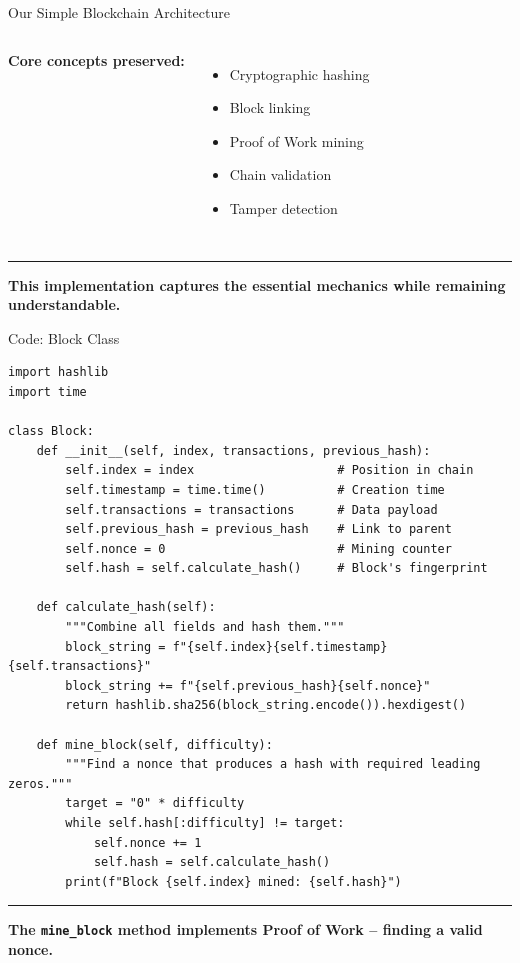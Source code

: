 \documentclass[8pt,aspectratio=169]{beamer}
\newcommand{\bottomnote}[1]{%
\vfill
\vspace{-2mm}
\textcolor{mllavender2}{\rule{\textwidth}{0.4pt}}
\vspace{1mm}
\footnotesize
\textbf{#1}
}
\begin{document}
\begin{frame}[t]{Our Simple Blockchain Architecture}
\begin{columns}[T]
\vspace{0.5em}
\textbf{Core concepts preserved:}
\begin{itemize}
\item[\textcolor{mlgreen}{$\checkmark$}] Cryptographic hashing
\item[\textcolor{mlgreen}{$\checkmark$}] Block linking
\item[\textcolor{mlgreen}{$\checkmark$}] Proof of Work mining
\item[\textcolor{mlgreen}{$\checkmark$}] Chain validation
\item[\textcolor{mlgreen}{$\checkmark$}] Tamper detection
\end{itemize}
\end{columns}

\bottomnote{This implementation captures the essential mechanics while remaining understandable.}
\end{frame}

\begin{frame}[fragile]{Code: Block Class}
\begin{lstlisting}[style=python]
import hashlib
import time

class Block:
    def __init__(self, index, transactions, previous_hash):
        self.index = index                    # Position in chain
        self.timestamp = time.time()          # Creation time
        self.transactions = transactions      # Data payload
        self.previous_hash = previous_hash    # Link to parent
        self.nonce = 0                        # Mining counter
        self.hash = self.calculate_hash()     # Block's fingerprint

    def calculate_hash(self):
        """Combine all fields and hash them."""
        block_string = f"{self.index}{self.timestamp}{self.transactions}"
        block_string += f"{self.previous_hash}{self.nonce}"
        return hashlib.sha256(block_string.encode()).hexdigest()

    def mine_block(self, difficulty):
        """Find a nonce that produces a hash with required leading zeros."""
        target = "0" * difficulty
        while self.hash[:difficulty] != target:
            self.nonce += 1
            self.hash = self.calculate_hash()
        print(f"Block {self.index} mined: {self.hash}")
\end{lstlisting}

\bottomnote{The \texttt{mine\_block} method implements Proof of Work -- finding a valid nonce.}
\end{frame}
\end{document}
